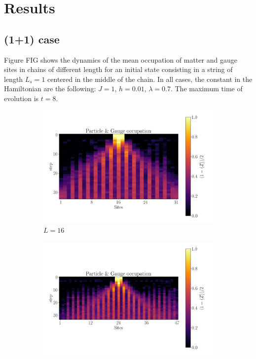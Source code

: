 \documentclass[a4paper]{article}
\begin{document}
\section{Results}

\subsection{(1+1) case}

Figure FIG shows the dynamics of the mean occupation of matter and gauge sites in chains of different length for an initial state consisting in a string of length $L_s = 1$ centered in the middle of the chain. In all cases, the constant in the Hamiltonian are the following: $J = 1$, $h = 0.01$, $\lambda = 0.7$. The maximum time of evolution is $t = 8$.

\begin{figure}[!ht]
    \centering
    \begin{subfigure}[l]{0.4\textwidth}
        \centering
        \includegraphics[width=\textwidth]{Results figs/hardware_z2pairquench_maxt_8_steps_35_L_16_J_1.0000_h_0.0500_lamb_0.7000_g_None_pp_7_pl_1_zne_True_linear_1-1.2-1.5_mm_True_dc_XY4_pt_True_xbasis_False.png}
        \caption{$L = 16$}
    \end{subfigure}
    \begin{subfigure}[l]{0.58\textwidth}
        \centering
        \includegraphics[width=\textwidth]{Results figs/hardware_z2pairquench_maxt_8_steps_35_L_24_J_1.0000_h_0.0500_lamb_0.7000_g_None_pp_11_pl_1_zne_True_linear_1-1.2-1.5_mm_True_dc_XY4_pt_True_xbasis_False.png}

\end{subfigure}
\end{figure}
\end{document}
